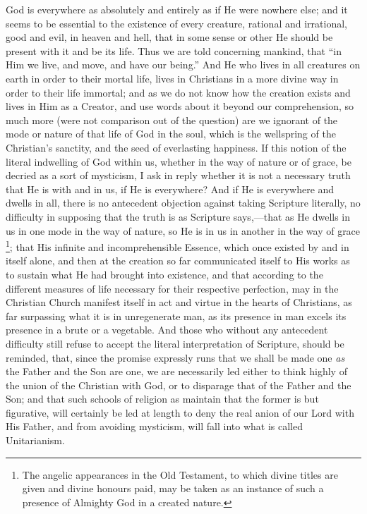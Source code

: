 God is everywhere as absolutely and entirely as if He were nowhere
else; and it seems to be essential to the existence of every creature,
rational and irrational, good and evil, in heaven and hell, that in
some sense or other He should be present with it and be its life. Thus
we are told concerning mankind, that ``in Him we live, and move,
and have our being.'' And He who lives in all creatures on earth
in order to their mortal life, lives in Christians in a more divine
way in order to their life immortal; and as we do not know how the creation exists and lives in Him as a Creator, and use words about
it beyond our comprehension, so much more (were not comparison out of
the question) are we ignorant of the mode or nature of that life of
God in the soul, which is the wellspring of the Christian's sanctity,
and the seed of everlasting happiness. If this notion of the literal
indwelling of God within us, whether in the way of nature or of grace,
be decried as a sort of mysticism, I ask in reply whether it is not a
necessary truth that He is with and in us, if He is everywhere? And if
He is everywhere and dwells in all, there is no antecedent objection
against taking Scripture literally, no difficulty in supposing that
the truth is as Scripture says,—that as He dwells in us in one mode
in the way of nature, so He is in us in another in the way of grace \footnote{The angelic
appearances in the Old Testament, to which divine titles are given and
divine honours paid, may be taken as an instance of such a presence of
Almighty God in a created nature.}; that His infinite and incomprehensible Essence, which once
existed by and in itself alone, and then at the creation so far
communicated itself to His works as to sustain what He had brought
into existence, and that according to the different measures of life
necessary for their respective perfection, may in the Christian Church
manifest itself in act and virtue in the hearts of Christians, as far
surpassing what it is in unregenerate man, as its presence in man
excels its presence in a brute or a vegetable. And those who without
any antecedent difficulty still refuse to accept the literal
interpretation of Scripture, should be reminded, that, since the
promise expressly runs that we shall be made one \emph{as} the Father
and the Son are one, we are necessarily led either to think
highly of the union of the Christian with God, or to disparage that of
the Father and the Son; and that such schools of religion as maintain
that the former is but figurative, will certainly be led at length to
deny the real anion of our Lord with His Father, and from avoiding
mysticism, will fall into what is called Unitarianism.

